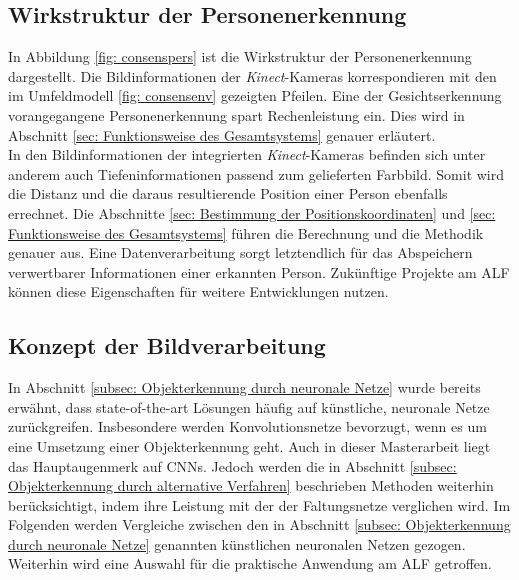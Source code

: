 		\subsection{Wirkstruktur der Personenerkennung}
		\label{subsec: Wirkstrukur Personenerkennung}
		
		
		
		
	
		In Abbildung \ref{fig: consenspers} ist die Wirkstruktur der Personenerkennung dargestellt. Die Bildinformationen der \textit{Kinect}-Kameras korrespondieren mit den im Umfeldmodell \ref{fig: consensenv} gezeigten Pfeilen. Eine der Gesichtserkennung vorangegangene Personenerkennung spart Rechenleistung ein. Dies wird in Abschnitt \ref{sec: Funktionsweise des Gesamtsystems} genauer erläutert.\\
		
		In den Bildinformationen der integrierten \textit{Kinect}-Kameras befinden sich unter anderem auch Tiefeninformationen passend zum gelieferten Farbbild. Somit wird die Distanz und die daraus resultierende Position einer Person ebenfalls errechnet. Die Abschnitte \ref{sec: Bestimmung der Positionskoordinaten} und \ref{sec: Funktionsweise des Gesamtsystems} führen die Berechnung und die Methodik genauer aus. Eine Datenverarbeitung sorgt letztendlich für das Abspeichern verwertbarer Informationen einer erkannten Person. Zukünftige Projekte am ALF können diese Eigenschaften für weitere Entwicklungen nutzen.\\   
		
		\subsection{Konzept der Bildverarbeitung}
		\label{subsec: Auswahl und Training der verwendeten neuronalen Netze}
		
		In Abschnitt \ref{subsec: Objekterkennung durch neuronale Netze} wurde bereits erwähnt, dass state-of-the-art Lösungen häufig auf künstliche, neuronale Netze zurückgreifen. Insbesondere werden Konvolutionsnetze bevorzugt, wenn es um eine Umsetzung einer Objekterkennung geht. Auch in dieser Masterarbeit liegt das Hauptaugenmerk auf CNNs. Jedoch werden die in Abschnitt \ref{subsec: Objekterkennung durch alternative Verfahren} beschrieben Methoden weiterhin berücksichtigt, indem ihre Leistung mit der der Faltungsnetze verglichen wird. Im Folgenden werden Vergleiche zwischen den in Abschnitt \ref{subsec: Objekterkennung durch neuronale Netze} genannten künstlichen neuronalen Netzen gezogen. Weiterhin wird eine Auswahl für die praktische Anwendung am ALF getroffen. \\
		
